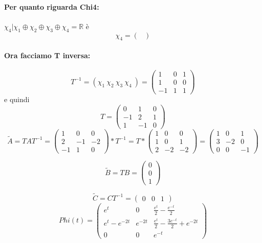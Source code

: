 \documentclass{article}
\begin{document}
\paragraph{Per quanto riguarda Chi4:} $ \chi_4 | \chi_1 \oplus \chi_2 \oplus  \chi_3 \oplus \chi_4 = \mathbb{R} $ è \[ \chi_4 = \left(\begin{matrix}\end{matrix}\right) \]
\paragraph{Ora facciamo T inversa:} \[ T^{-1} = (\chi_1\ \chi_2\ \chi_3\ \chi_4\ ) = \left(\begin{matrix}1 & 0 & 1\\1 & 0 & 0\\-1 & 1 & 1\end{matrix}\right) \]
e quindi \[T = \left(\begin{matrix}0 & 1 & 0\\-1 & 2 & 1\\1 & -1 & 0\end{matrix}\right)\]
\[ \widetilde{A} = TAT^{-1} = \left(\begin{matrix}1 & 0 & 0\\2 & -1 & -2\\-1 & 1 & 0\end{matrix}\right) * T^{-1} = T*\left(\begin{matrix}1 & 0 & 0\\1 & 0 & 1\\2 & -2 & -2\end{matrix}\right) =\left(\begin{matrix}1 & 0 & 1\\3 & -2 & 0\\0 & 0 & -1\end{matrix}\right) \]

\[ \widetilde{B} = T B = \left(\begin{matrix}0\\0\\1\end{matrix}\right) \]

\[ \widetilde{C} = C T^{-1} = \left(\begin{matrix}0 & 0 & 1\end{matrix}\right) \]
\[Phi(t) = \left(\begin{matrix}e^{t} & 0 & \frac{e^{t}}{2} - \frac{e^{- t}}{2}\\e^{t} - e^{- 2 t} & e^{- 2 t} & \frac{e^{t}}{2} - \frac{3 e^{- t}}{2} + e^{- 2 t}\\0 & 0 & e^{- t}\end{matrix}\right) \]
\end{document}
